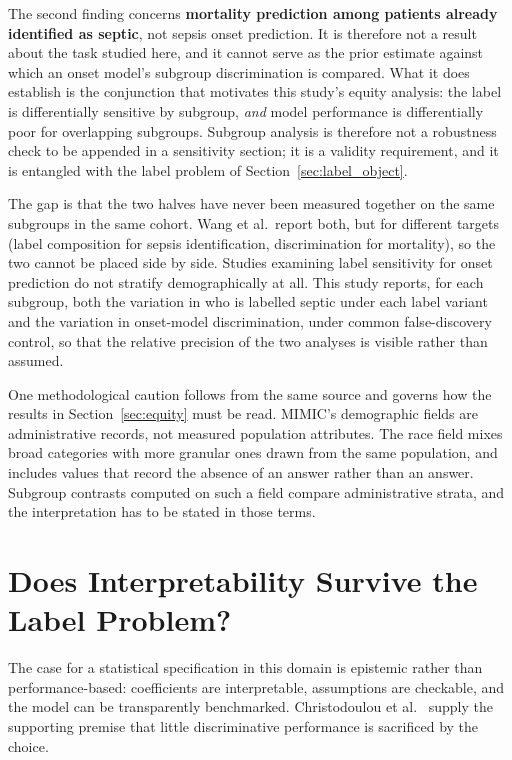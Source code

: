 The second finding concerns \textbf{mortality prediction among patients already
identified as septic}, not sepsis onset prediction. It is therefore not a
result about the task studied here, and it cannot serve as the prior estimate
against which an onset model's subgroup discrimination is compared. What it
does establish is the conjunction that motivates this study's equity analysis:
the label is differentially sensitive by subgroup, \emph{and} model performance
is differentially poor for overlapping subgroups. Subgroup analysis is
therefore not a robustness check to be appended in a sensitivity section; it is
a validity requirement, and it is entangled with the label problem of
Section~\ref{sec:label_object}.

The gap is that the two halves have never been measured together on the same
subgroups in the same cohort. Wang et al.\ report both, but for different
targets (label composition for sepsis identification, discrimination for
mortality), so the two cannot be placed side by side. Studies examining label
sensitivity for onset prediction do not stratify demographically at all. This
study reports, for each subgroup, both the variation in who is labelled septic
under each label variant and the variation in onset-model discrimination, under
common false-discovery control, so that the relative precision of the two
analyses is visible rather than assumed.

One methodological caution follows from the same source and governs how the
results in Section~\ref{sec:equity} must be read. MIMIC's demographic fields
are administrative records, not measured population attributes. The race field
mixes broad categories with more granular ones drawn from the same population,
and includes values that record the absence of an answer rather than an answer.
Subgroup contrasts computed on such a field compare administrative strata, and
the interpretation has to be stated in those terms.


\section{Does Interpretability Survive the Label Problem?}
\label{sec:interpretability_survives}

The case for a statistical specification in this domain is epistemic rather
than performance-based: coefficients are interpretable, assumptions are
checkable, and the model can be transparently benchmarked. Christodoulou et
al.\ \cite{christodoulou2019cox} supply the supporting premise that little
discriminative performance is sacrificed by the choice.

